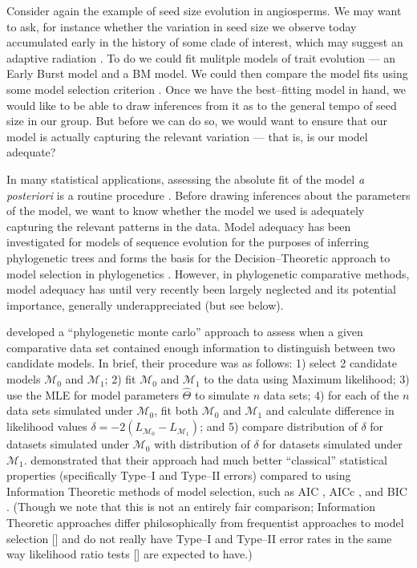 \documentclass[12pt]{article}
\begin{document}
Consider again the example of seed size evolution in angiosperms. We may want to ask, for instance whether the variation in seed size we observe today accumulated early in the history of some clade of interest, which may suggest an adaptive radiation \citep{Simpson 1944, Simpson1953, Schulter2000, Yoder2010, SlaterPennell}. To do we could fit mulitple models of trait evolution --- an Early Burst model \citep{Blomberg2003, Harmon2010} and a BM model. We could then compare the model fits using some model selection criterion \citep[e.g. AIC;][]{Akaike1973}. Once we have the best--fitting model in hand, we would like to be able to draw inferences from it as to the general tempo of seed size in our group. But before we can do so, we would want to ensure that our model is actually capturing the relevant variation --- that is, is our model adequate?

In many statistical applications, assessing the absolute fit of the model \textit{a posteriori} is a routine procedure \citep{Gelmanbook}. Before drawing inferences about the parameters of the model, we want to know whether the model we used is adequately capturing the relevant patterns in the data. Model adequacy has been investigated for models of sequence evolution for the purposes of inferring phylogenetic trees \citep[e.g.][]{GautLewis1995, SullivanSwofford, Goldman, HuelsenbeckBull1996, SandersonKim, Bollback2002, Ripplinger2010, Lewis2013, Brown2013} and forms the basis for the Decision--Theoretic approach to model selection in phylogenetics \citep{Minin2003, Abdo2005, SullivanJoyce2005}. However, in phylogenetic comparative methods, model adequacy has until very recently been largely neglected and its potential importance, generally underappreciated (but see below).

\citet{Boettiger2012} developed a ``phylogenetic monte carlo'' approach to assess when a given comparative data set contained enough information to distinguish between two candidate models. In brief, their procedure was as follows: 1) select 2 candidate models $\mathcal{M}_0$ and $\mathcal{M}_1$; 2) fit $\mathcal{M}_0$ and $\mathcal{M}_1$ to the data using Maximum likelihood; 3) use the MLE for model parameters $\hat{\Theta}$ to simulate $n$ data sets; 4) for each of the $n$ data sets simulated under $\mathcal{M}_0$, fit both $\mathcal{M}_0$ and $\mathcal{M}_1$ and calculate difference in likelihood values $\delta = -2(L_{\mathcal{M}_0} - L_{\mathcal{M}_1})$; and 5) compare distribution of $\delta$ for datasets simulated under $\mathcal{M}_0$ with distribution of $\delta$ for datasets simulated under $\mathcal{M}_1$. \citet{Boettiger2012} demonstrated that their approach had much better ``classical'' statistical properties (specifically Type--I and Type--II errors) compared to using Information Theoretic methods of model selection, such as AIC \citep{Akaike1973}, AICc \citep{AICC}, and BIC \citep{Schwarz1978}. (Though we note that this is not an entirely fair comparison; Information Theoretic approaches differ philosophically from frequentist approaches to model selection [\citealt{BA2004}] and do not really have Type--I and Type--II error rates in the same way likelihood ratio tests [\citealt{Wilks1938}] are expected to have.)
\end{document}
